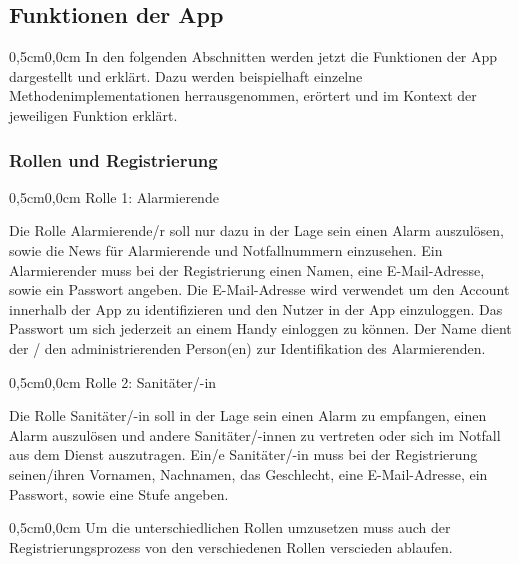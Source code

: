 \subsection{Funktionen der App}
    \begin{changemargin}{0,5cm}{0,0cm}
        In den folgenden Abschnitten werden jetzt die Funktionen der App dargestellt und erklärt.
        Dazu werden beispielhaft einzelne Methodenimplementationen herrausgenommen, erörtert und
        im Kontext der jeweiligen Funktion erklärt.   
    \end{changemargin}
    \subsubsection{Rollen und Registrierung}
        \begin{changemargin}{0,5cm}{0,0cm}
            Rolle 1: Alarmierende\;

            Die Rolle Alarmierende/r soll nur dazu in der Lage sein einen Alarm auszulösen, 
            sowie die News für Alarmierende und Notfallnummern einzusehen.\;
            Ein Alarmierender muss bei der Registrierung einen Namen, eine E-Mail-Adresse, sowie ein
            Passwort angeben.
            Die E-Mail-Adresse wird verwendet um den Account innerhalb der App zu identifizieren und 
            den Nutzer in der App einzuloggen. Das Passwort um sich jederzeit an einem Handy
            einloggen zu können. Der Name dient der / den administrierenden Person(en) zur
            Identifikation des Alarmierenden.
        \end{changemargin}

        \begin{changemargin}{0,5cm}{0,0cm}
            Rolle 2: Sanitäter/-in\;

            Die Rolle Sanitäter/-in soll in der Lage sein einen Alarm zu empfangen, einen Alarm
            auszulösen und andere Sanitäter/-innen zu vertreten oder sich im Notfall aus dem Dienst 
            auszutragen.
            Ein/e Sanitäter/-in muss bei der Registrierung seinen/ihren Vornamen,  Nachnamen,
            das Geschlecht, eine E-Mail-Adresse, ein Passwort, sowie eine Stufe angeben.

        \end{changemargin}

        \begin{changemargin}{0,5cm}{0,0cm}
            Um die unterschiedlichen Rollen umzusetzen muss auch der Registrierungsprozess von
            den verschiedenen Rollen verscieden ablaufen.
        \end{changemargin}

